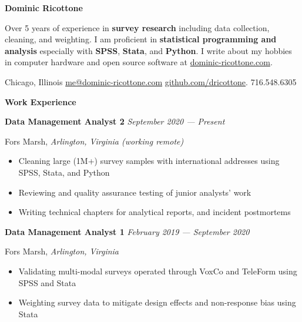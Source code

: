 \documentclass[12pt]{article}
\begin{document}
\centering
{\textbf{\Huge Dominic Ricottone}}



\raggedright
\vspace{.5em}
Over 5 years of experience in \textbf{survey research}
including data collection, cleaning, and weighting.
I am proficient in \textbf{statistical programming and analysis} especially with
\textbf{SPSS}, \textbf{Stata}, and \textbf{Python}.
I write about my hobbies in computer hardware and open source software at
\href{https://www.dominic-ricottone.com}{dominic-ricottone.com}.



\centering
\vspace{.5em}
 Chicago, Illinois
\enspace
{} \href{mailto:me@dominic-ricottone.com}{me@dominic-ricottone.com}
\enspace
{} \href{https://github.com/dricottone}{github.com/dricottone}.
\enspace
{} 716.548.6305



\raggedright
\vspace{.75em}
\textbf{\Large Work Experience} \hrulefill
\vspace{.5em}

\textbf{Data Management Analyst 2} \hfill \textit{September 2020 --- Present}
\par Fors Marsh, \textit{Arlington, Virginia (working remote)}
\begin{itemize}[]
\item Cleaning large (1M+) survey samples with international addresses using SPSS, Stata, and Python
\item Reviewing and quality assurance testing of junior analysts' work
\item Writing technical chapters for analytical reports, and incident postmortems
\end{itemize}

\par \textbf{Data Management Analyst 1} \hfill \textit{February 2019 --- September 2020}
\par Fors Marsh, \textit{Arlington, Virginia}
\begin{itemize}[]
\item Validating multi-modal surveys operated through VoxCo and TeleForm using SPSS and Stata
\item Weighting survey data to mitigate design effects and non-response bias using Stata
\end{itemize}
\end{document}
